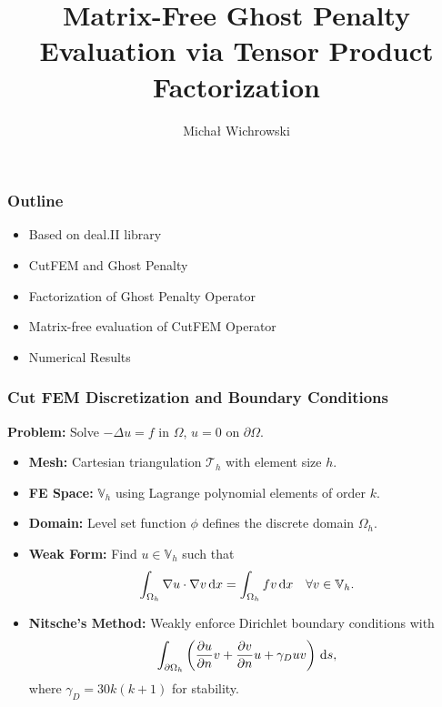 \documentclass{beamer}
\title{Matrix-Free Ghost Penalty Evaluation via Tensor Product Factorization}
\author{ \Large Michał Wichrowski}
\institute{ Heidelberg University}
\begin{document}
\begin{frame}
    \titlepage
\end{frame}

\begin{frame}
    \frametitle{Outline}
    \begin{itemize}
        \item Based on deal.II library
        \item CutFEM and Ghost Penalty
        \item  Factorization of Ghost Penalty Operator
        \item Matrix-free evaluation of  CutFEM Operator
        \item Numerical Results
    \end{itemize}
\end{frame}

\begin{frame}
    \frametitle{Cut FEM Discretization and Boundary Conditions}
    \textbf{Problem:} Solve $-\Delta u = f$ in $\Omega$, $u = 0$ on $\partial\Omega$.
    \begin{itemize}
        \item \textbf{Mesh:} Cartesian triangulation $\mathcal{T}_h$ with element size $h$.
        \item \textbf{FE Space:} $\mathbb{V}_h$ using Lagrange polynomial elements of order $k$.
        \item \textbf{Domain:} Level set function $\phi$ defines the discrete domain $\Omega_h$.
        \item \textbf{Weak Form:} Find $u \in \mathbb{V}_h$ such that
              \[
                  \int_{\Omega_h} \nabla u \cdot \nabla v \,\mathrm{d}x = \int_{\Omega_h} f v \,\mathrm{d}x \quad \forall v \in
                  \mathbb{V}_h.
              \]
        \item \textbf{Nitsche's Method:} Weakly enforce Dirichlet boundary conditions with
              \[
                  \int_{\partial\Omega_h} \left( \frac{\partial u}{\partial n} v + \frac{\partial v}{\partial n} u +
                  \gamma_D u v \right) \,\mathrm{d}s,
              \]
              where \( \gamma_D = 30 k (k+1) \) for stability.
    \end{itemize}
\end{frame}
\end{document}

